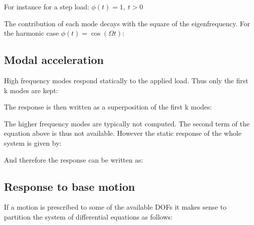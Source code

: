 \documentclass[10pt,a4paper]{scrartcl}
\begin{document}
\begin{multicols*}{2}

For instance for a step load: $\phi(t)=1,\ t>0$


The contribution of each mode decays with the square of the eigenfrequency. For the harmonic case $\phi(t)=\cos(\Omega t)$:


\subsection{Modal acceleration}

High frequency modes respond statically to the applied load. Thus only the first k modes are kept:


The response is then written as a superposition of the first k modes:


The higher frequency modes are typically not computed. The second term of the equation above is thus not available. However the static response of the whole system is given by:


And therefore the response can be written as:


\subsection{Response to base motion}

If a motion is prescribed to some of the available DOFs it makes sense to partition the system of differential equations as follows:


\end{multicols*}
\end{document}
